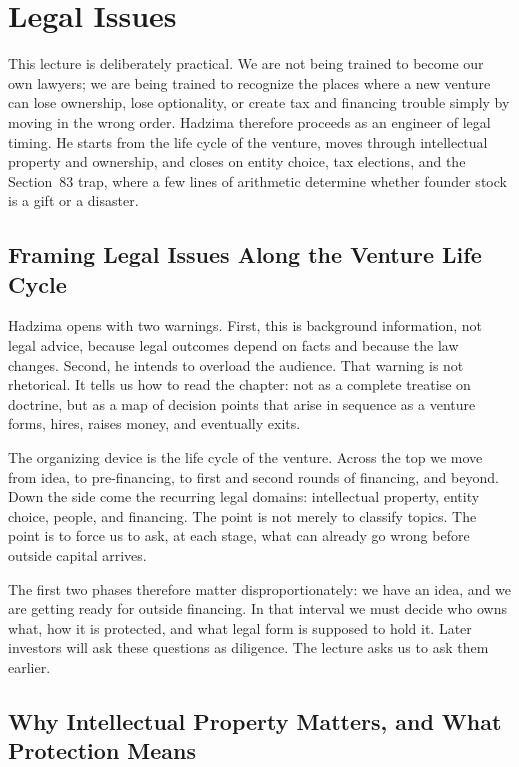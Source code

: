 \chapter{Legal Issues}

This lecture is deliberately practical. We are not being trained to become our own lawyers; we are being trained to recognize the places where a new venture can lose ownership, lose optionality, or create tax and financing trouble simply by moving in the wrong order. Hadzima therefore proceeds as an engineer of legal timing. He starts from the life cycle of the venture, moves through intellectual property and ownership, and closes on entity choice, tax elections, and the Section~83 trap, where a few lines of arithmetic determine whether founder stock is a gift or a disaster.

\section{Framing Legal Issues Along the Venture Life Cycle}

Hadzima opens with two warnings. First, this is background information, not legal advice, because legal outcomes depend on facts and because the law changes. Second, he intends to overload the audience. That warning is not rhetorical. It tells us how to read the chapter: not as a complete treatise on doctrine, but as a map of decision points that arise in sequence as a venture forms, hires, raises money, and eventually exits.

The organizing device is the life cycle of the venture. Across the top we move from idea, to pre-financing, to first and second rounds of financing, and beyond. Down the side come the recurring legal domains: intellectual property, entity choice, people, and financing. The point is not merely to classify topics. The point is to force us to ask, at each stage, what can already go wrong before outside capital arrives.

The first two phases therefore matter disproportionately: we have an idea, and we are getting ready for outside financing. In that interval we must decide who owns what, how it is protected, and what legal form is supposed to hold it. Later investors will ask these questions as diligence. The lecture asks us to ask them earlier.

\section{Why Intellectual Property Matters, and What Protection Means}

